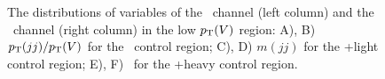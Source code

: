 \begin{figure}[htbp]
{    
  }
  \caption[Low $\pT(\bosV)$ Control Region Distributions for the \ZllH\ Channels]{The distributions of variables of the \ZeeH\ channel (left column) and the \ZmmH\ channel (right column) in the low $\pT(\bosV)$ region: A), B) $p_{\mathrm{T}}(jj) / p_{\mathrm{T}}(V)$ for the \qrkt\qrktbar\ control region; C), D) $m(jj)$ for the \bosZ+light control region; E), F) \btagmin\ for the \bosZ+heavy control region.}
  \label{fig:CR_Zll_LowPt}
\end{figure}

\clearpage


